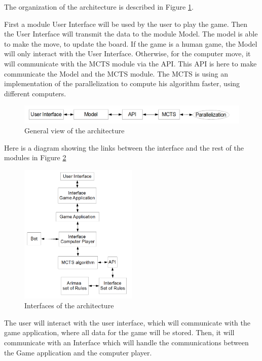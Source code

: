 The organization of the architecture is described in Figure \ref{fig:gra}.

First a module User Interface will be used by the user to play the game. Then the User Interface will transmit the data to the module Model. The model is able to make the move, to update the board. If the game is a human game, the Model will only interact with the User Interface. Otherwise, for the computer move, it will communicate with the MCTS module via the API. This API is here to make communicate the Model and the MCTS module. The MCTS is using an implementation of the parallelization to compute his algorithm faster, using different computers.

\begin{figure}[!h]
\centering
\includegraphics[width=1\textwidth]{2General_Architecture/2.1.2GeneralView/graphe2.png}
\caption{General view of the architecture}
\label{fig:gra}
\end{figure}


Here is a diagram showing the links between the interface and the rest of the modules in Figure \ref{fig:gen}

\begin{figure}[!h]
\centering
\includegraphics[width=0.5\textwidth]{2General_Architecture/2.1.2GeneralView/gen.png}
\caption{Interfaces of the architecture}
\label{fig:gen}
\end{figure}

The user will interact with the user interface, which will communicate with the game application, where all data for the game will be stored. Then, it will communicate with an Interface which will handle the communications between the Game application and the computer player. 

